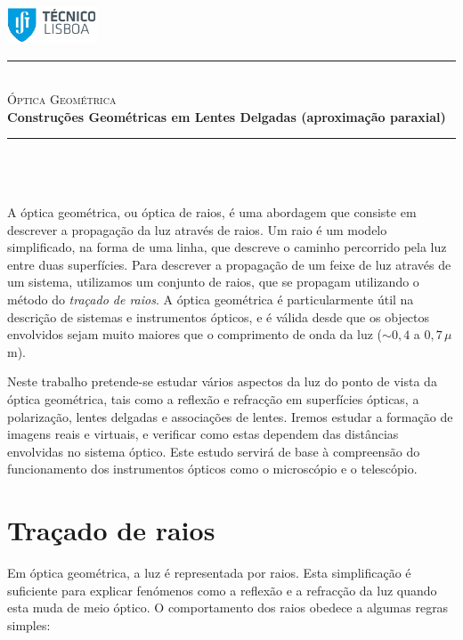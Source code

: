 \documentclass[a4paper,12pt]{article}      %
\author{Prof. Bernardo B. Carvalho}
\date{ Outubro 2012}
\newcommand{\HRule}{\rule{\linewidth}{0.5mm}}
\begin{document}
 

	\includegraphics[width=0.2\textwidth]{../../logo-ist}%

	\HRule \\[0.5cm]
	{ \huge \sf  \textsc{Óptica Geométrica}} \\[0.4cm] %
	{ \large \bfseries Construções Geométricas em Lentes Delgadas (aproximação paraxial)}\\
	\HRule \\%

\section{}
A óptica geométrica, ou óptica de raios, é uma abordagem que consiste em descrever a propagação da luz através de raios. Um raio é um modelo simplificado, na forma de uma linha, que descreve o caminho percorrido pela luz entre duas superfícies. Para descrever a propagação de um feixe de luz através de um sistema, utilizamos um conjunto de raios, que se propagam utilizando o método do \emph{traçado de raios}.
A óptica geométrica é particularmente útil na descrição de sistemas e instrumentos ópticos, e é válida desde que os objectos envolvidos sejam muito maiores que o comprimento de onda da luz ($\sim 0,4$ a $0,7\, \mu$m).

Neste trabalho pretende-se estudar vários aspectos da luz do ponto de vista da óptica geométrica, tais como a reflexão e refracção em superfícies ópticas, a polarização, lentes delgadas e associações de lentes. Iremos estudar a formação de imagens reais e virtuais, e verificar como estas dependem das distâncias envolvidas no sistema óptico. Este estudo servirá de base à compreensão do funcionamento dos instrumentos ópticos como o microscópio e o telescópio.

\section{\sf Traçado de raios}
Em óptica geométrica, a luz é representada por raios. Esta simplificação é suficiente para explicar fenómenos como a reflexão e a refracção da luz quando esta muda de meio óptico. O comportamento dos raios obedece a algumas regras simples:
\end{document}
